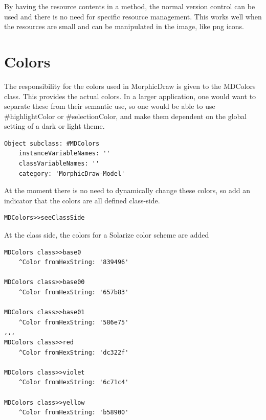\documentclass[10pt]{article}   	%
\begin{document}
By having the resource contents in a method, the normal version
control can be used and there is no need for specific resource
management. This works well when the resources are small and can be
manipulated in the image, like png icons.  

\section{Colors}
The responsibility for the colors used in MorphicDraw is given to the MDColors class.
This provides the actual colors. In a larger application, one would want to
separate these from their semantic use, so one would be able to use
 \#highlightColor or \#selectionColor, and make them dependent on the global
 setting of a dark or light theme.
\begin{verbatim}
Object subclass: #MDColors
    instanceVariableNames: ''
    classVariableNames: ''
    category: 'MorphicDraw-Model'
\end{verbatim}
At the moment there is no need to dynamically change these colors, so add
an indicator that the colors are all defined class-side.
\begin{verbatim}
MDColors>>seeClassSide
\end{verbatim}
At the class side, the colors for a Solarize color scheme are added
\begin{verbatim}
MDColors class>>base0
    ^Color fromHexString: '839496'

MDColors class>>base00
    ^Color fromHexString: '657b83'

MDColors class>>base01
    ^Color fromHexString: '586e75'
,,,
MDColors class>>red
    ^Color fromHexString: 'dc322f'

MDColors class>>violet
    ^Color fromHexString: '6c71c4'

MDColors class>>yellow
    ^Color fromHexString: 'b58900'
\end{verbatim}

\end{document}
